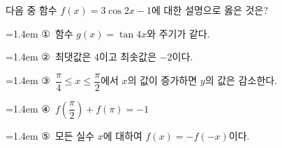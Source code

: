 다음 중 함수 $f(x)=3\cos 2x-1$에 대한 설명으로 옳은 것은?
\par\medskip\par\noindent\hangindent=1.4em {\small ①}\ 함수 $g(x)=\tan 4x$와 주기가 같다.\par\noindent\hangindent=1.4em {\small ②}\ 최댓값은 $4$이고 최솟값은 $-2$이다.\par\noindent\hangindent=1.4em {\small ③}\ $\dfrac{\pi}{4}\le x\le\dfrac{\pi}{2}$에서 $x$의 값이 증가하면 $y$의 값은 감소한다.\par\noindent\hangindent=1.4em {\small ④}\ $f\left(\dfrac{\pi}{2}\right)+f(\pi)=-1$\par\noindent\hangindent=1.4em {\small ⑤}\ 모든 실수 $x$에 대하여 $f(x)=-f(-x)$이다.\par\medskip
